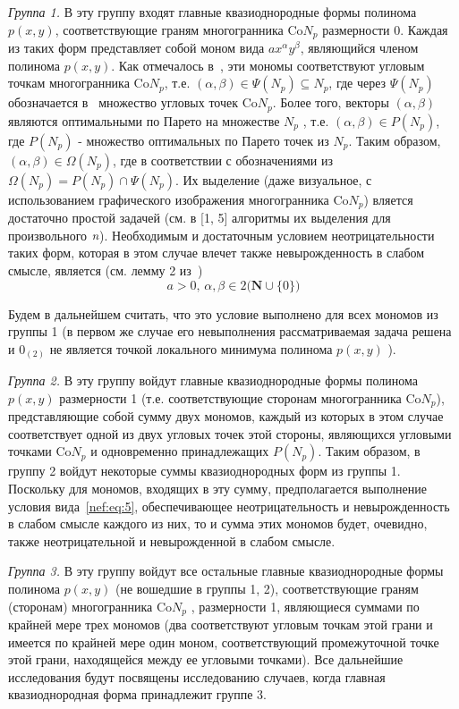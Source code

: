 \emph{Группа 1.} В эту группу входят главные квазиоднородные формы полинома $p(x,y)$, соответствующие граням многогранника $\text{Co}N_p$ размерности 0. Каждая из таких форм представляет собой моном вида $ax^{\alpha}y^{\beta}$, являющийся членом полинома $p(x,y)$. Как отмечалось в~\cite{nef:3}, эти мономы соответствуют угловым точкам многогранника $\text{Co}N_p$, т.е. $(\alpha,\beta)\in\Psi(N_p)\subseteq N_p$, где через $\Psi(N_p)$ обозначается в~\cite{nef:3} множество угловых точек $\text{Co}N_p$. Более того, векторы $(\alpha,\beta)$ являются оптимальными по Парето на множестве $N_p$ , т.е. $(\alpha,\beta)\in P(N_p)$, где $P(N_p)$ - множество оптимальных по Парето точек из $N_p$. Таким образом, $(\alpha,\beta)\in\Omega(N_p)$,  где в соответствии с обозначениями из~\cite{nef:3} $\Omega(N_p)=P(N_p)\cap\Psi(N_p)$. Их выделение (даже визуальное, с использованием графического изображения многогранника $\text{Co}N_p$)
вляется достаточно простой задачей (см. в [1, 5] алгоритмы их выделения для произвольного $\emph{n}$). Необходимым и достаточным условием неотрицательности таких форм, которая в этом случае влечет также невырожденность в слабом смысле, является (см. лемму 2 из~\cite{nef:3})
\begin{equation} \label{nef:eq:5}
	a>0,\,\alpha,\beta\in2\big(\mathbf{N}\cup\{0\}\big)
\end{equation}

Будем в дальнейшем считать, что это условие выполнено для всех мономов из группы 1 (в первом же случае его невыполнения рассматриваемая задача решена и $0_{(2)}$ не является точкой локального минимума полинома $p(x,y)$ ).

\emph{Группа 2.} В эту группу войдут главные квазиоднородные формы полинома $p(x,y)$ размерности 1 (т.е. соответствующие сторонам многогранника $\text{Co}N_p$), представляющие собой сумму двух мономов, каждый из которых в этом случае соответствует одной из двух угловых точек этой стороны, являющихся угловыми точками $\text{Co}N_p$ и одновременно принадлежащих $P(N_p)$. Таким образом, в группу 2 войдут некоторые суммы квазиоднородных форм из группы 1. Поскольку для мономов, входящих в эту сумму, предполагается выполнение условия вида~\eqref{nef:eq:5}, обеспечивающее неотрицательность и невырожденность в слабом смысле каждого из них, то и сумма этих мономов будет, очевидно, также неотрицательной и невырожденной в слабом смысле.

\emph{Группа 3.} В эту группу войдут все остальные главные квазиоднородные формы полинома $p(x,y)$ (не вошедшие в группы 1, 2), соответствующие граням (сторонам) многогранника $\text{Co}N_p$ ,  размерности 1, являющиеся суммами по крайней мере трех мономов (два соответствуют угловым точкам этой грани и имеется по крайней мере один моном, соответствующий промежуточной точке этой грани, находящейся между ее угловыми точками). Все дальнейшие исследования будут посвящены исследованию случаев, когда главная квазиоднородная форма принадлежит группе 3. 

